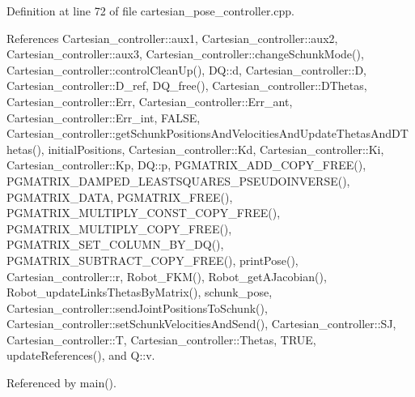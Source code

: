 Definition at line 72 of file cartesian\-\_\-pose\-\_\-controller.\-cpp.



References Cartesian\-\_\-controller\-::aux1, Cartesian\-\_\-controller\-::aux2, Cartesian\-\_\-controller\-::aux3, Cartesian\-\_\-controller\-::change\-Schunk\-Mode(), Cartesian\-\_\-controller\-::control\-Clean\-Up(), D\-Q\-::d, Cartesian\-\_\-controller\-::\-D, Cartesian\-\_\-controller\-::\-D\-\_\-ref, D\-Q\-\_\-free(), Cartesian\-\_\-controller\-::\-D\-Thetas, Cartesian\-\_\-controller\-::\-Err, Cartesian\-\_\-controller\-::\-Err\-\_\-ant, Cartesian\-\_\-controller\-::\-Err\-\_\-int, F\-A\-L\-S\-E, Cartesian\-\_\-controller\-::get\-Schunk\-Positions\-And\-Velocities\-And\-Update\-Thetas\-And\-D\-Thetas(), initial\-Positions, Cartesian\-\_\-controller\-::\-Kd, Cartesian\-\_\-controller\-::\-Ki, Cartesian\-\_\-controller\-::\-Kp, D\-Q\-::p, P\-G\-M\-A\-T\-R\-I\-X\-\_\-\-A\-D\-D\-\_\-\-C\-O\-P\-Y\-\_\-\-F\-R\-E\-E(), P\-G\-M\-A\-T\-R\-I\-X\-\_\-\-D\-A\-M\-P\-E\-D\-\_\-\-L\-E\-A\-S\-T\-S\-Q\-U\-A\-R\-E\-S\-\_\-\-P\-S\-E\-U\-D\-O\-I\-N\-V\-E\-R\-S\-E(), P\-G\-M\-A\-T\-R\-I\-X\-\_\-\-D\-A\-T\-A, P\-G\-M\-A\-T\-R\-I\-X\-\_\-\-F\-R\-E\-E(), P\-G\-M\-A\-T\-R\-I\-X\-\_\-\-M\-U\-L\-T\-I\-P\-L\-Y\-\_\-\-C\-O\-N\-S\-T\-\_\-\-C\-O\-P\-Y\-\_\-\-F\-R\-E\-E(), P\-G\-M\-A\-T\-R\-I\-X\-\_\-\-M\-U\-L\-T\-I\-P\-L\-Y\-\_\-\-C\-O\-P\-Y\-\_\-\-F\-R\-E\-E(), P\-G\-M\-A\-T\-R\-I\-X\-\_\-\-S\-E\-T\-\_\-\-C\-O\-L\-U\-M\-N\-\_\-\-B\-Y\-\_\-\-D\-Q(), P\-G\-M\-A\-T\-R\-I\-X\-\_\-\-S\-U\-B\-T\-R\-A\-C\-T\-\_\-\-C\-O\-P\-Y\-\_\-\-F\-R\-E\-E(), print\-Pose(), Cartesian\-\_\-controller\-::r, Robot\-\_\-\-F\-K\-M(), Robot\-\_\-get\-A\-Jacobian(), Robot\-\_\-update\-Links\-Thetas\-By\-Matrix(), schunk\-\_\-pose, Cartesian\-\_\-controller\-::send\-Joint\-Positions\-To\-Schunk(), Cartesian\-\_\-controller\-::set\-Schunk\-Velocities\-And\-Send(), Cartesian\-\_\-controller\-::\-S\-J, Cartesian\-\_\-controller\-::\-T, Cartesian\-\_\-controller\-::\-Thetas, T\-R\-U\-E, update\-References(), and Q\-::v.



Referenced by main().


